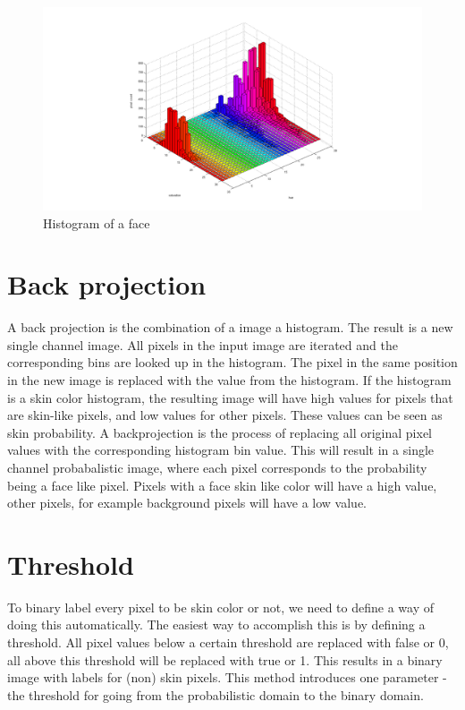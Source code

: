 \begin{figure}[htbp]
	\center
	\includegraphics[width=0.8\linewidth]{figures/face_hist.png}
	\caption{Histogram of a face}
	\label{fig:face_hsv}
\end{figure}

\section{Back projection}
A back projection is the combination of a image a histogram. The result is a new single channel image. All pixels in the input image are iterated and the corresponding bins are looked up in the histogram. The pixel in the same position in the new image is replaced with the value from the histogram. If the histogram is a skin color histogram, the resulting image will have high values for pixels that are skin-like pixels, and low values for other pixels. These values can be seen as skin probability.
A backprojection is the process of replacing all original pixel values with the corresponding histogram bin value. This will result in a single channel probabalistic image, where each pixel corresponds to the probability being a face like pixel. Pixels with a face skin like color will have a high value, other pixels, for example background pixels will have a low value.

\section{Threshold}
To binary label every pixel to be skin color or not, we need to define a way of doing this automatically. The easiest way to accomplish this is by defining a threshold. All pixel values below a certain threshold are replaced with false or 0, all above this threshold will be replaced with true or 1. This results in a binary image with labels for (non) skin pixels. This method introduces one parameter - the threshold for going from the probabilistic domain to the binary domain.

